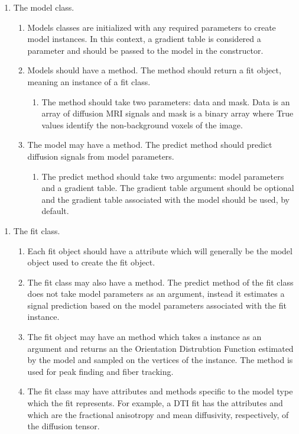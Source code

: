 \begin{enumerate}
\item The model class.
\begin{enumerate}
\item Models classes are initialized with any required parameters to create model instances. In this context, a gradient table is considered a parameter and should be passed to the model in the constructor.
\item Models should have a  method. The  method should return a fit object, meaning an instance of a fit class.
\begin{enumerate}
\item The  method should take two parameters: data and mask. Data is an array of diffusion MRI signals and mask is a binary array where True values identify the non-background voxels of the image.
\end{enumerate}
\item The model may have a  method. The predict method should predict diffusion signals from model parameters.
\begin{enumerate}
\item The predict method should take two arguments: model parameters and a gradient table. The gradient table argument should be optional and the gradient table associated with the model should be used, by default.
\end{enumerate}
\end{enumerate}
\end{enumerate}
\begin{enumerate}
    \item The fit class.
    \begin{enumerate}
        \item Each fit object should have a  attribute which will generally be the model object used to create the fit object.
        \item The fit class may also have a  method. The predict method of the fit class does not take model parameters as an argument, instead it estimates a signal prediction based on the model parameters associated with the fit instance.
        \item The fit object may have an  method which takes a  instance as an argument and returns an the Orientation Distrubtion Function estimated by the model and sampled on the vertices of the  instance. The  method is used for peak finding and fiber tracking.
        \item The fit class may have attributes and methods specific to the model type which the fit represents. For example, a DTI fit has the attributes  and  which are the fractional anisotropy and mean diffusivity, respectively, of the diffusion tensor.
    \end{enumerate}
\end{enumerate}


